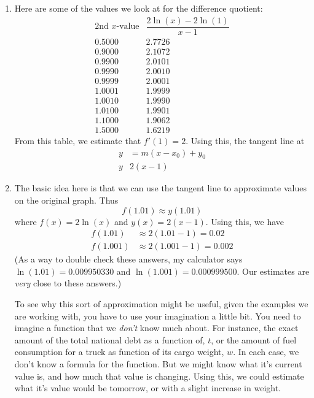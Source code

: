 \documentclass[oneside]{book}
\theoremstyle{definition}
\theoremstyle{solution}
\newtheorem*{solution}{Solution}
\newenvironment{solution}{\vspace{2in}\comment}{\endcomment}
\begin{document}
\begin{solution}
\begin{enumerate}
\item Here are some of the values we look at for the difference
  quotient:
$$
\begin{array}{c|c}
\text{2nd $x$-value} & \dfrac{2\ln(x)-2\ln(1)}{x-1}\\ \hline
    0.5000 & 2.7726 \\
    0.9000 & 2.1072 \\
    0.9900 & 2.0101 \\
    0.9990 & 2.0010 \\
    0.9999 & 2.0001 \\
1.0001     & 1.9999 \\
1.0010     & 1.9990 \\
1.0100     & 1.9901 \\
1.1000     & 1.9062 \\
1.5000     & 1.6219
\end{array}
$$
From this table, we estimate that $f'(1) = 2$.  Using this, the tangent line at
\begin{align*}
y & = m(x-x_0) + y_0\\
y & 2(x-1)
\end{align*}

\item The basic idea here is that we can use the tangent line to
  approximate values on the original graph.  Thus
$$
f(1.01) \approx y(1.01) 
$$
where $f(x) = 2\ln(x)$ and $y(x) = 2(x-1)$.  Using this, we have
\begin{align*}
f(1.01) & \approx 2(1.01-1) = 0.02\\
f(1.001) & \approx 2(1.001-1) = 0.002
\end{align*}
(As a way to double check these answers, my calculator says $\ln(1.01)
= 0.009950330$ and $\ln(1.001) = 0.000999500$.  Our estimates are
\emph{very} close to these answers.)

To see why this sort of approximation might be useful, given the
examples we are working with, you have to use your imagination a
little bit.  You need to imagine a function that we \emph{don't} know
much about.  For instance, the exact amount of the total national debt
as a function of, $t$, or the amount of fuel consumption for a truck as
function of its cargo weight, $w$.  In each case, we don't know a
formula for the function.  But we might know what it's current value
is, and how much that value is changing.  Using this, we could
estimate what it's value would be tomorrow, or with a slight increase
in weight.
\end{enumerate}
\end{solution}
\end{document}
